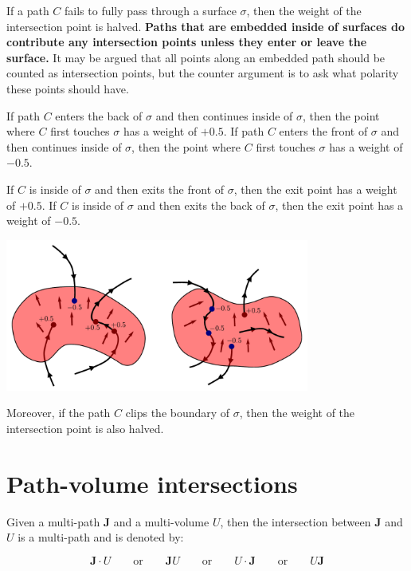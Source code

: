 \documentclass{book}
\begin{document}
If a path \(C\) fails to fully pass through a surface \(\sigma\), then the weight of the intersection point is halved. {\bf Paths that are embedded inside of surfaces do contribute any intersection points unless they enter or leave the surface.} It may be argued that all points along an embedded path should be counted as intersection points, but the counter argument is to ask what polarity these points should have.

If path \(C\) enters the back of \(\sigma\) and then continues inside of \(\sigma\), then the point where \(C\) first touches \(\sigma\) has a weight of \(+0.5\). If path \(C\) enters the front of \(\sigma\) and then continues inside of \(\sigma\), then the point where \(C\) first touches \(\sigma\) has a weight of \(-0.5\). 

If \(C\) is inside of \(\sigma\) and then exits the front of \(\sigma\), then the exit point has a weight of \(+0.5\). If \(C\) is inside of \(\sigma\) and then exits the back of \(\sigma\), then the exit point has a weight of \(-0.5\). 

\begin{center}
\includegraphics[width = 0.75\textwidth]{Intersections/Path-surface_intersections/path_surface_intersection_boundary_case}
\end{center}

Moreover, if the path \(C\) clips the boundary of \(\sigma\), then the weight of the intersection point is also halved.





\section{Path-volume intersections}

Given a multi-path \(\mathbf{J}\) and a multi-volume \(U\), then the intersection between \(\mathbf{J}\) and \(U\) is a multi-path and is denoted by:

\[\mathbf{J} \cdot U \quad\quad\text{or}\quad\quad \mathbf{J} U \quad\quad\text{or}\quad\quad U \cdot \mathbf{J} \quad\quad\text{or}\quad\quad U \mathbf{J}\]
\end{document}

